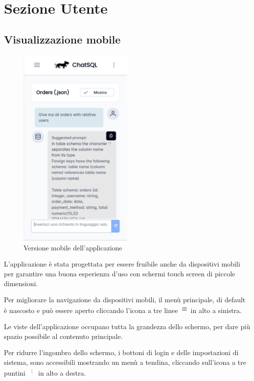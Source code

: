 \section{Sezione Utente}
\label{sec:sezUtente}

\subsection{Visualizzazione mobile}
\begin{figure}[H]
  \centering
  \includegraphics[width=0.50\textwidth]{assets/mobile.png}
  \caption{Versione mobile dell'applicazione}
\end{figure}
\par L'applicazione è stata progettata per essere fruibile anche da dispositivi mobili per garantire una buona esperienza d'uso con schermi touch screen di piccole dimensioni.  
\par Per migliorare la navigazione da dispositivi mobili, il menù principale, di default è nascosto e può essere aperto cliccando l'icona a tre linee \includegraphics[height=1.2em]{assets/dd_burger_menu.png} in alto a sinistra.
\par Le viste dell'applicazione occupano tutta la grandezza dello schermo, per dare più spazio possibile al contenuto principale.
\par Per ridurre l'ingombro dello schermo, i bottoni di login e delle impostazioni di sistema, sono accessibili mostrando un menù a tendina, cliccando sull'icona a tre puntini \includegraphics[height=1.2em]{assets/dd_kebab_menu.png} in alto a destra.

